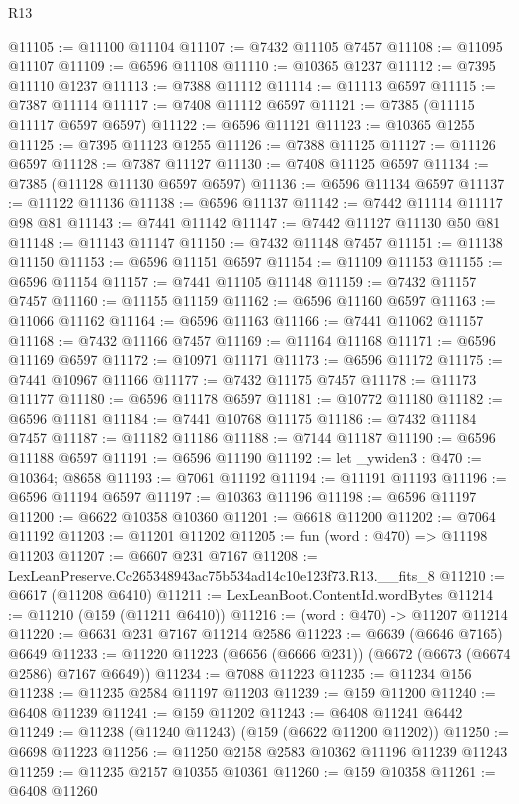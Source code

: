 \begin{lexlean}{R13}
\begin{coremodule}
@11105 := @11100 @11104
@11107 := @7432 @11105 @7457
@11108 := @11095 @11107
@11109 := @6596 @11108
@11110 := @10365 @1237
@11112 := @7395 @11110 @1237
@11113 := @7388 @11112
@11114 := @11113 @6597
@11115 := @7387 @11114
@11117 := @7408 @11112 @6597
@11121 := @7385 (@11115 @11117 @6597 @6597)
@11122 := @6596 @11121
@11123 := @10365 @1255
@11125 := @7395 @11123 @1255
@11126 := @7388 @11125
@11127 := @11126 @6597
@11128 := @7387 @11127
@11130 := @7408 @11125 @6597
@11134 := @7385 (@11128 @11130 @6597 @6597)
@11136 := @6596 @11134 @6597
@11137 := @11122 @11136
@11138 := @6596 @11137
@11142 := @7442 @11114 @11117 @98 @81
@11143 := @7441 @11142
@11147 := @7442 @11127 @11130 @50 @81
@11148 := @11143 @11147
@11150 := @7432 @11148 @7457
@11151 := @11138 @11150
@11153 := @6596 @11151 @6597
@11154 := @11109 @11153
@11155 := @6596 @11154
@11157 := @7441 @11105 @11148
@11159 := @7432 @11157 @7457
@11160 := @11155 @11159
@11162 := @6596 @11160 @6597
@11163 := @11066 @11162
@11164 := @6596 @11163
@11166 := @7441 @11062 @11157
@11168 := @7432 @11166 @7457
@11169 := @11164 @11168
@11171 := @6596 @11169 @6597
@11172 := @10971 @11171
@11173 := @6596 @11172
@11175 := @7441 @10967 @11166
@11177 := @7432 @11175 @7457
@11178 := @11173 @11177
@11180 := @6596 @11178 @6597
@11181 := @10772 @11180
@11182 := @6596 @11181
@11184 := @7441 @10768 @11175
@11186 := @7432 @11184 @7457
@11187 := @11182 @11186
@11188 := @7144 @11187
@11190 := @6596 @11188 @6597
@11191 := @6596 @11190
@11192 := let _ywiden3 : @470 := @10364; @8658
@11193 := @7061 @11192
@11194 := @11191 @11193
@11196 := @6596 @11194 @6597
@11197 := @10363 @11196
@11198 := @6596 @11197
@11200 := @6622 @10358 @10360
@11201 := @6618 @11200
@11202 := @7064 @11192
@11203 := @11201 @11202
@11205 := fun (word : @470) => @11198 @11203
@11207 := @6607 @231 @7167
@11208 := LexLeanPreserve.Cc265348943ac75b534ad14c10e123f73.R13.__fits_8
@11210 := @6617 (@11208 @6410)
@11211 := LexLeanBoot.ContentId.wordBytes
@11214 := @11210 (@159 (@11211 @6410))
@11216 := (word : @470) -> @11207 @11214
@11220 := @6631 @231 @7167 @11214 @2586
@11223 := @6639 (@6646 @7165) @6649
@11233 := @11220 @11223 (@6656 (@6666 @231)) (@6672 (@6673 (@6674 @2586) @7167 @6649))
@11234 := @7088 @11223
@11235 := @11234 @156
@11238 := @11235 @2584 @11197 @11203
@11239 := @159 @11200
@11240 := @6408 @11239
@11241 := @159 @11202
@11243 := @6408 @11241 @6442
@11249 := @11238 (@11240 @11243) (@159 (@6622 @11200 @11202))
@11250 := @6698 @11223
@11256 := @11250 @2158 @2583 @10362 @11196 @11239 @11243
@11259 := @11235 @2157 @10355 @10361
@11260 := @159 @10358
@11261 := @6408 @11260

\end{coremodule}
\end{lexlean}
